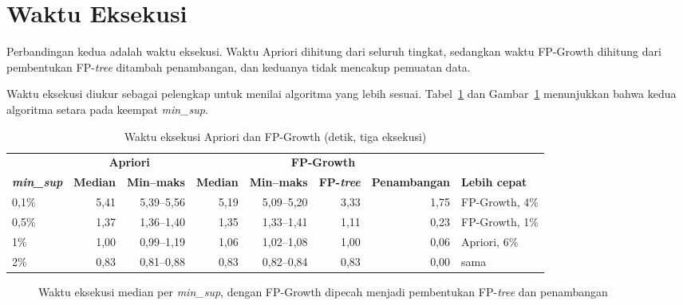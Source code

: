 \section{Waktu Eksekusi}
\label{sec:hasil-t6-waktu}
Perbandingan kedua adalah waktu eksekusi. Waktu Apriori dihitung dari seluruh tingkat, sedangkan waktu FP-Growth dihitung dari pembentukan FP-\textit{tree} ditambah penambangan, dan keduanya tidak mencakup pemuatan data.

Waktu eksekusi diukur sebagai pelengkap untuk menilai algoritma yang lebih sesuai. Tabel~\ref{tab:t6-waktu} dan Gambar~\ref{fig:t6-waktu} menunjukkan bahwa kedua algoritma setara pada keempat \textit{min\_sup}.

\begin{table}[!htb]
\caption{Waktu eksekusi Apriori dan FP-Growth (detik, tiga eksekusi)}
\label{tab:t6-waktu}
\footnotesize
\setlength{\tabcolsep}{4pt}
\begin{tabular*}{\textwidth}{@{\extracolsep{\fill}}@{}lrrrrrrl@{}}
\toprule
 & \multicolumn{2}{c}{\textbf{Apriori}} & \multicolumn{4}{c}{\textbf{FP-Growth}} & \\
\cmidrule(lr){2-3}\cmidrule(lr){4-7}
\textbf{\textit{min\_sup}} & \textbf{Median} & \textbf{Min--maks} & \textbf{Median} & \textbf{Min--maks} & \textbf{FP-\textit{tree}} & \textbf{Penambangan} & \textbf{Lebih cepat} \\
\midrule
0,1\% & 5,41 & 5,39--5,56 & 5,19 & 5,09--5,20 & 3,33 & 1,75 & FP-Growth, 4\% \\
0,5\% & 1,37 & 1,36--1,40 & 1,35 & 1,33--1,41 & 1,11 & 0,23 & FP-Growth, 1\% \\
1\% & 1,00 & 0,99--1,19 & 1,06 & 1,02--1,08 & 1,00 & 0,06 & Apriori, 6\% \\
2\% & 0,83 & 0,81--0,88 & 0,83 & 0,82--0,84 & 0,83 & 0,00 & sama \\
\bottomrule
\end{tabular*}
\end{table}

\begin{figure}[!htb]
\centering
{}
\caption{Waktu eksekusi median per \textit{min\_sup}, dengan FP-Growth dipecah menjadi pembentukan FP-\textit{tree} dan penambangan}
\label{fig:t6-waktu}
\end{figure}

